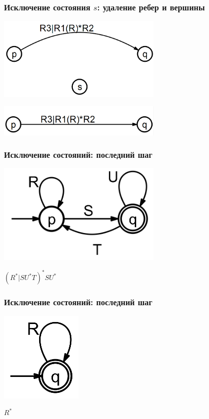 \documentclass{beamer}
\begin{document}
\begin{frame}
  \transwipe[direction=90]
  \frametitle{Исключение состояния $s$: удаление ребер и вершины}
    \begin{center}
      \includegraphics[width=0.60\textwidth]{pics/elim3.png}  
      
      \includegraphics[width=0.60\textwidth]{pics/elim4.png}  
    \end{center}
\end{frame}

\begin{frame}
  \transwipe[direction=90]
  \frametitle{Исключение состояний: последний шаг}
    \begin{center}
      \includegraphics[width=0.6\textwidth]{pics/elim_final.png} 
    \end{center}

    $(R^* | S U^* T)^* S U^*$
\end{frame}

\begin{frame}
  \transwipe[direction=90]
  \frametitle{Исключение состояний: последний шаг}
    \begin{center}
      \includegraphics[width=0.3\textwidth]{pics/elim_final2.png}  
    \end{center}
    
    $R^*$
\end{frame}
\end{document}
